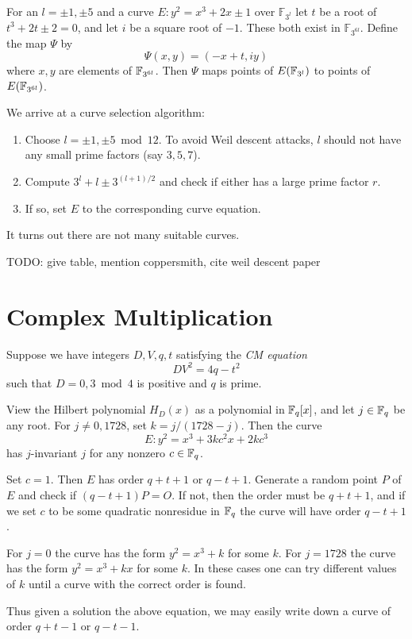 For an $l = \pm 1, \pm 5$ and a
curve $E : y^2 = x^3 + 2 x \pm 1$ over $\mathbb{F}_{3^l}$
let $t$ be a root of $t^3 + 2t \pm 2 = 0$, and let $i$ be a
square root of $-1$. These both exist in $\mathbb{F}_{3^{6l}}$.
Define the map $\Psi$ by
\[ \Psi(x,y) = (-x + t, i y) \]
where $x, y$ are elements of $\mathbb{F}_{3^{6l}}$. Then $\Psi$ maps points
of $E(\mathbb{F}_{3^l})$ to points of $E(\mathbb{F}_{3^{6l}})$.

We arrive at a curve selection algorithm:

\begin{enumerate}
\item
Choose $l = \pm 1, \pm 5 \bmod 12$. To avoid Weil descent attacks,
$l$ should not have any small prime factors (say $3,5,7$).
\item
Compute $3^l + l \pm 3^{(l+1)/2}$ and check if either has a large prime
factor $r$.
\item
If so, set $E$ to the corresponding curve equation.
\end{enumerate}

It turns out there are not many suitable curves.

TODO: give table, mention coppersmith, cite weil descent paper

\section {Complex Multiplication}

Suppose we have integers $D, V, q, t$ satisfying the \emph{CM equation}
\[ D V^2 = 4 q - t^2 \]
such that $D = 0, 3 \bmod 4$ is positive and $q$ is prime.

View the Hilbert polynomial $H_D(x)$ as a polynomial in $\mathbb{F}_q[x]$,
and let $j \in \mathbb{F}_q$ be any root. For $j \ne 0, 1728$, set
$k = j / (1728 - j)$. Then the curve
\[ E: y^2 = x^3 + 3 k c^2 x + 2 k c^3 \]
has $j$-invariant $j$ for any nonzero $c \in \mathbb{F}_q$.

Set $c = 1$. Then $E$ has order $q + t + 1$ or $q - t + 1$.
Generate a random point $P$ of $E$ and check if
$(q-t+1)P = O$. If not, then the order must be $q + t + 1$,
and if we set $c$ to be some quadratic nonresidue in $\mathbb{F}_q$ the
curve will have order $q - t + 1$.

For $j = 0$ the curve has the form $y^2 = x^3 + k$ for some $k$.
For $j = 1728$ the curve has the form $y^2 = x^3 + k x$ for some $k$.
In these cases one can try different values of $k$ until a curve
with the correct order is found.

Thus given a solution the above equation, we may easily write down
a curve of order $q+t-1$ or $q-t-1$.

